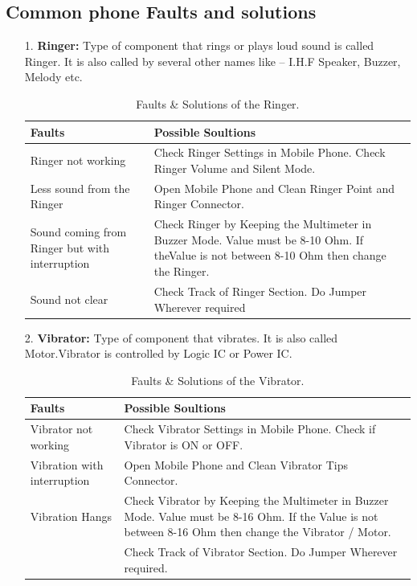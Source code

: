 \subsection{Common phone Faults and solutions}
\begin{itemize}
\item[1.] \textbf{Ringer:} Type of component that rings or plays loud sound is called Ringer. It is also called by several other names like – I.H.F Speaker, Buzzer, Melody etc.
\begin{table}[!ht]
\centering
\begin{tabular}{|p{2.5in}|p{3.5in}|}
\hline
\textbf{Faults} & \textbf{Possible Soultions} \\ \hline
Ringer not working & Check Ringer Settings in Mobile Phone. Check Ringer Volume and Silent Mode.\\ 
Less sound from the Ringer & Open Mobile Phone and Clean Ringer Point and Ringer Connector. \\ Sound coming from Ringer but with interruption & Check Ringer by Keeping the Multimeter in Buzzer Mode. Value must be 8-10 Ohm. If theValue is not between 8-10 Ohm then change the Ringer. \\ 
Sound not clear & Check Track of Ringer Section. Do Jumper Wherever required \\
\hline
\end{tabular}
\caption{Faults \& Solutions of the Ringer.}
\end{table}

\item[2.] \textbf{Vibrator:} Type of component that vibrates. It is also called Motor.Vibrator is controlled by Logic IC or Power IC.
\begin{table}[!ht]
\centering
\begin{tabular}{|p{2.5in}|p{3.5in}|}
\hline
\textbf{Faults} & \textbf{Possible Soultions} \\ \hline
Vibrator not working & Check Vibrator Settings in Mobile Phone. Check if Vibrator is ON or OFF.\\ 
Vibration with interruption & Open Mobile Phone and Clean Vibrator Tips Connector. \\ 
Vibration Hangs & Check Vibrator by Keeping the Multimeter in Buzzer Mode. Value must be 8-16 Ohm. If the Value is not between 8-16 Ohm then change the Vibrator / Motor.\\ 
                & Check Track of Vibrator Section. Do Jumper Wherever required.\\
\hline
\end{tabular}
\caption{Faults \& Solutions of the Vibrator.}
\end{table}


\end{itemize}
